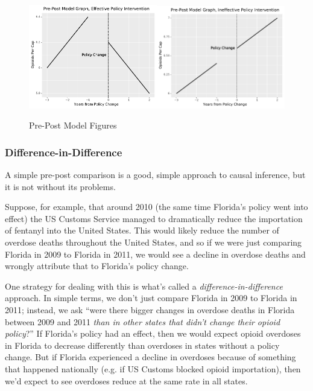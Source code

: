 \documentclass[12pt]{article}
\begin{document}
\begin{figure}[h!]
  \centering
  \caption{Pre-Post Model Figures}\label{figure_prepost_examples}
  \includegraphics[width=0.5\textwidth]{images/prepost_successful.pdf}\includegraphics[width=0.5\textwidth]{images/prepost_failed.pdf}
\end{figure}
\pagebreak


\subsubsection*{Difference-in-Difference}

A simple pre-post comparison is a good, simple approach to causal inference, but it is not without its problems.

Suppose, for example, that around 2010 (the same time Florida's policy went into effect) the US Customs Service managed to dramatically reduce the importation of fentanyl into the United States. This would likely reduce the number of overdose deaths throughout the United States, and so if we were just comparing Florida in 2009 to Florida in 2011, we would see a decline in overdose deaths and wrongly attribute that to Florida's policy change.

One strategy for dealing with this is what's called a \emph{difference-in-difference} approach. In simple terms, we don't just compare Florida in 2009 to Florida in 2011; instead, we ask ``were there bigger changes in overdose deaths in Florida between 2009 and 2011 \emph{than in other states that didn't change their opioid policy}?'' If Florida's policy had an effect, then we would expect opioid overdoses in Florida to decrease differently than overdoses in states without a policy change. But if Florida experienced a decline in overdoses because of something that happened nationally (e.g. if US Customs blocked opioid importation), then we'd expect to see overdoses reduce at the same rate in all states.
\end{document}
